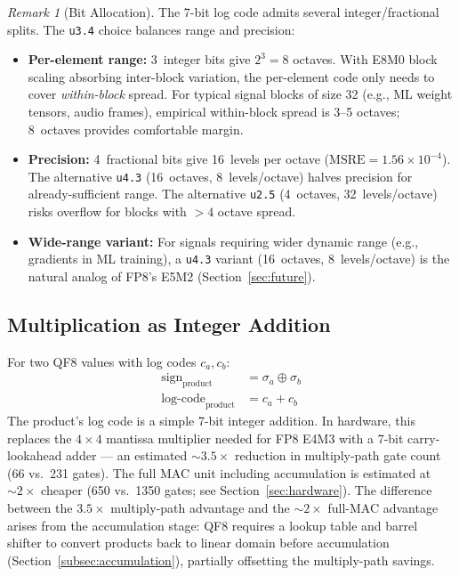 \documentclass[11pt,letterpaper]{article}
\theoremstyle{definition}
\theoremstyle{remark}
\newtheorem{remark}[theorem]{Remark}
\newcommand{\MSRE}{\mathrm{MSRE}}
\begin{document}
\begin{remark}[Bit Allocation]
\label{rem:why-u34}
The 7-bit log code admits several integer/fractional splits.
The \texttt{u3.4} choice balances range and precision:
\begin{itemize}[leftmargin=2em]
  \item \textbf{Per-element range:} 3~integer bits give $2^3 = 8$ octaves.
    With E8M0 block scaling absorbing inter-block variation, the per-element
    code only needs to cover \emph{within-block} spread.
    For typical signal blocks of size 32 (e.g., ML weight tensors, audio
    frames), empirical within-block spread is 3--5 octaves; 8~octaves provides
    comfortable margin.
  \item \textbf{Precision:} 4~fractional bits give 16~levels per octave
    ($\MSRE = 1.56 \times 10^{-4}$).
    The alternative \texttt{u4.3} (16~octaves, 8~levels/octave) halves
    precision for already-sufficient range.
    The alternative \texttt{u2.5} (4~octaves, 32~levels/octave) risks overflow
    for blocks with $>4$ octave spread.
  \item \textbf{Wide-range variant:} For signals requiring wider dynamic range
    (e.g., gradients in ML training), a \texttt{u4.3} variant
    (16~octaves, 8~levels/octave) is the natural analog of FP8's E5M2
    (Section~\ref{sec:future}).
\end{itemize}
\end{remark}

\subsection{Multiplication as Integer Addition}

For two QF8 values with log codes $c_a, c_b$:
\begin{align}
  \text{sign}_{\text{product}} &= \sigma_a \oplus \sigma_b
    \label{eq:sign-xor} \\
  \text{log-code}_{\text{product}} &= c_a + c_b \label{eq:log-add}
\end{align}
The product's log code is a simple 7-bit integer addition.
In hardware, this replaces the $4 \times 4$ mantissa multiplier needed for FP8
E4M3 with a 7-bit carry-lookahead adder --- an estimated ${\sim}3.5\times$
reduction in multiply-path gate count (66 vs.\ 231 gates).
The full MAC unit including accumulation is estimated at ${\sim}2\times$ cheaper
(650 vs.\ 1350 gates; see Section~\ref{sec:hardware}).
The difference between the $3.5\times$ multiply-path advantage and the
${\sim}2\times$ full-MAC advantage arises from the accumulation stage:
QF8 requires a lookup table and barrel shifter to convert products back to
linear domain before accumulation (Section~\ref{subsec:accumulation}),
partially offsetting the multiply-path savings.
\end{document}
